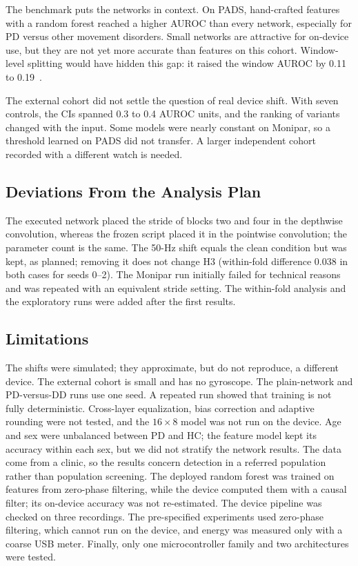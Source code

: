 \documentclass[journal,twoside,web]{ieeecolor}
\begin{document}
The benchmark puts the networks in context. On PADS, hand-crafted features with a random forest reached a higher AUROC than every network, especially for PD versus other movement disorders. Small networks are attractive for on-device use, but they are not yet more accurate than features on this cohort. Window-level splitting would have hidden this gap: it raised the window AUROC by 0.11 to 0.19~\cite{Saeb2017,Kapoor2023}.

The external cohort did not settle the question of real device shift. With seven controls, the CIs spanned 0.3 to 0.4 AUROC units, and the ranking of variants changed with the input. Some models were nearly constant on Monipar, so a threshold learned on PADS did not transfer. A larger independent cohort recorded with a different watch is needed.

\subsection{Deviations From the Analysis Plan}\label{sec:dev}
The executed network placed the stride of blocks two and four in the depthwise convolution, whereas the frozen script placed it in the pointwise convolution; the parameter count is the same. The 50-Hz shift equals the clean condition but was kept, as planned; removing it does not change H3 (within-fold difference 0.038 in both cases for seeds 0--2). The Monipar run initially failed for technical reasons and was repeated with an equivalent stride setting. The within-fold analysis and the exploratory runs were added after the first results.

\subsection{Limitations}
The shifts were simulated; they approximate, but do not reproduce, a different device. The external cohort is small and has no gyroscope. The plain-network and PD-versus-DD runs use one seed. A repeated run showed that training is not fully deterministic. Cross-layer equalization, bias correction and adaptive rounding were not tested, and the $16\times8$ model was not run on the device. Age and sex were unbalanced between PD and HC; the feature model kept its accuracy within each sex, but we did not stratify the network results. The data come from a clinic, so the results concern detection in a referred population rather than population screening. The deployed random forest was trained on features from zero-phase filtering, while the device computed them with a causal filter; its on-device accuracy was not re-estimated. The device pipeline was checked on three recordings. The pre-specified experiments used zero-phase filtering, which cannot run on the device, and energy was measured only with a coarse USB meter. Finally, only one microcontroller family and two architectures were tested.
\end{document}
